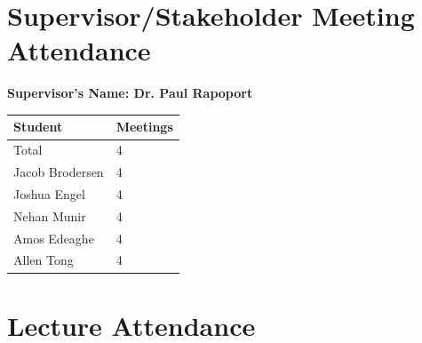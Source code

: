 \documentclass{article}
\begin{document}

\section{Supervisor/Stakeholder Meeting Attendance}


\noindent \textbf{Supervisor's Name: Dr. Paul Rapoport}

\begin{table}[H]
\centering
\begin{tabular}{ll}
\toprule
\textbf{Student} & \textbf{Meetings}\\
\midrule
Total & 4\\
Jacob Brodersen & 4\\
Joshua Engel & 4\\
Nehan Munir & 4\\
Amos Edeaghe & 4\\
Allen Tong & 4\\
\bottomrule
\end{tabular}
\end{table}


\section{Lecture Attendance}

\end{document}
